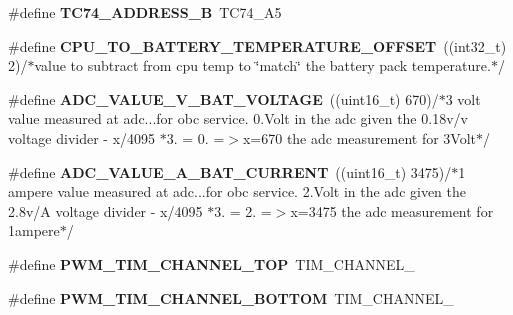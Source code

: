 \begin{DoxyCompactItemize}
\item 
\hypertarget{group__eps__configuration_gaa40fe3d73951dfa208df951a5f77147a}{\#define {\bfseries T\-C74\-\_\-\-A\-D\-D\-R\-E\-S\-S\-\_\-\-B}~T\-C74\-\_\-\-A5}\label{group__eps__configuration_gaa40fe3d73951dfa208df951a5f77147a}

\item 
\hypertarget{group__eps__configuration_ga0a77ce7b6ae596eccda4d65210d241f6}{\#define {\bfseries C\-P\-U\-\_\-\-T\-O\-\_\-\-B\-A\-T\-T\-E\-R\-Y\-\_\-\-T\-E\-M\-P\-E\-R\-A\-T\-U\-R\-E\-\_\-\-O\-F\-F\-S\-E\-T}~((int32\-\_\-t) 2)/$\ast$value to subtract from cpu temp to \char`\"{}match\char`\"{} the battery pack temperature.$\ast$/}\label{group__eps__configuration_ga0a77ce7b6ae596eccda4d65210d241f6}

\item 
\hypertarget{group__eps__configuration_ga35eef18cd8717c2b190bf2a39dbf6635}{\#define {\bfseries A\-D\-C\-\_\-\-V\-A\-L\-U\-E\-\_\-V\-\_\-\-B\-A\-T\-\_\-\-V\-O\-L\-T\-A\-G\-E}~((uint16\-\_\-t) 670)/$\ast$3 volt value measured at adc...\-for obc service. 0.\-Volt in the adc given the 0.\-18v/v voltage divider -\/ x/4095 $\ast$3. = 0. =$>$x=670 the adc measurement for 3\-Volt$\ast$/}\label{group__eps__configuration_ga35eef18cd8717c2b190bf2a39dbf6635}

\item 
\hypertarget{group__eps__configuration_ga3bac1d082253457a30399d75102c3c0b}{\#define {\bfseries A\-D\-C\-\_\-\-V\-A\-L\-U\-E\-\_\-A\-\_\-\-B\-A\-T\-\_\-\-C\-U\-R\-R\-E\-N\-T}~((uint16\-\_\-t) 3475)/$\ast$1 ampere value measured at adc...\-for obc service. 2.\-Volt in the adc given the 2.\-8v/\-A voltage divider -\/ x/4095 $\ast$3. = 2. =$>$x=3475 the adc measurement for 1ampere$\ast$/}\label{group__eps__configuration_ga3bac1d082253457a30399d75102c3c0b}

\item 
\hypertarget{group__eps__configuration_ga6bdaf2535b08a0d3cbd70a25a56f5fe6}{\#define {\bfseries P\-W\-M\-\_\-\-T\-I\-M\-\_\-\-C\-H\-A\-N\-N\-E\-L\-\_\-\-T\-O\-P}~T\-I\-M\-\_\-\-C\-H\-A\-N\-N\-E\-L\-\_}\label{group__eps__configuration_ga6bdaf2535b08a0d3cbd70a25a56f5fe6}

\item 
\hypertarget{group__eps__configuration_ga7a9821224aac985c8ae4ba0f8399604c}{\#define {\bfseries P\-W\-M\-\_\-\-T\-I\-M\-\_\-\-C\-H\-A\-N\-N\-E\-L\-\_\-\-B\-O\-T\-T\-O\-M}~T\-I\-M\-\_\-\-C\-H\-A\-N\-N\-E\-L\-\_}\label{group__eps__configuration_ga7a9821224aac985c8ae4ba0f8399604c}


\end{DoxyCompactItemize}
